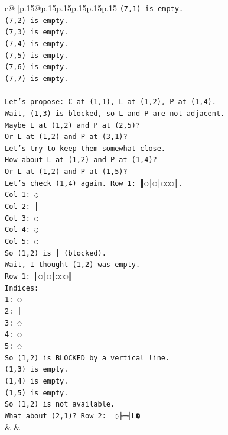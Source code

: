 \documentclass{article}
\begin{document}
{\begin{supertabular}{c@{$\;$}|p{.15\linewidth}@{}p{.15\linewidth}p{.15\linewidth}p{.15\linewidth}p{.15\linewidth}p{.15\linewidth}}
{{{\texttt{(7,1) is empty.} \\
\texttt{(7,2) is empty.} \\
\texttt{(7,3) is empty.} \\
\texttt{(7,4) is empty.} \\
\texttt{(7,5) is empty.} \\
\texttt{(7,6) is empty.} \\
\texttt{(7,7) is empty.} \\
\\ 
\texttt{Let's propose: C at (1,1), L at (1,2), P at (1,4).} \\
\texttt{Wait, (1,3) is blocked, so L and P are not adjacent.} \\
\texttt{Maybe L at (1,2) and P at (2,5)?} \\
\texttt{Or L at (1,2) and P at (3,1)?} \\
\texttt{Let's try to keep them somewhat close.} \\
\texttt{How about L at (1,2) and P at (1,4)?} \\
\texttt{Or L at (1,2) and P at (1,5)?} \\
\texttt{Let's check (1,4) again. Row 1: ║◌│◌│◌◌◌║.} \\
\texttt{Col 1: ◌} \\
\texttt{Col 2: │} \\
\texttt{Col 3: ◌} \\
\texttt{Col 4: ◌} \\
\texttt{Col 5: ◌} \\
\texttt{So (1,2) is │ (blocked).} \\
\texttt{Wait, I thought (1,2) was empty.} \\
\texttt{Row 1: ║◌│◌│◌◌◌║} \\
\texttt{Indices:} \\
\texttt{1: ◌} \\
\texttt{2: │} \\
\texttt{3: ◌} \\
\texttt{4: ◌} \\
\texttt{5: ◌} \\
\texttt{So (1,2) is BLOCKED by a vertical line.} \\
\texttt{(1,3) is empty.} \\
\texttt{(1,4) is empty.} \\
\texttt{(1,5) is empty.} \\
\texttt{So (1,2) is not available.} \\
\texttt{What about (2,1)? Row 2: ║◌├─┤L�} \\
            }
        }
    }
    & & \\ \\


\end{supertabular}}
\end{document}
